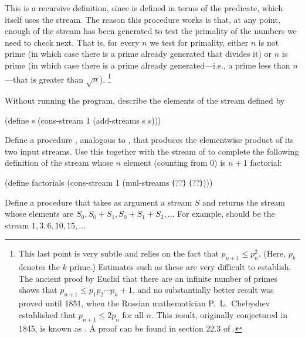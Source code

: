 This is a recursive definition, since  is defined in terms of the  predicate, which itself uses the  stream.
The reason this procedure works is that, at any point, enough of the  stream has been generated to test the primality of the numbers we need to check next.
That is, for every \( n \) we test for primality, either \( n \) is not prime (in which case there is a prime already generated that divides it) or \( n \) is prime (in which case there is a prime already generated---i.e., a prime less than \( n \)---that is greater than \( \sqrt{n} \)).%
\footnote{
	This last point is very subtle and relies on the fact that \( p_{n+1} ≤ p_n^2 \).
	(Here, \( p_k \) denotes the \( k \) prime.)
	Estimates such as these are very difficult to establish.
	The ancient proof by Euclid that there are an infinite number of primes shows that \( p_{n+1} ≤ p_1 p_2 \dotsm p_n + 1 \), and no substantially better result was proved until 1851, when the Russian mathematician P.~L.~Chebyshev established that \( p_{n+1} ≤ 2 p_n \) for all \( n \).
	This result, originally conjectured in 1845, is known as .
	A proof can be found in section 22.3 of .
}



\begin{exercise}
	\label{Exercise 3.53}
	Without running the program, describe the elements of the stream defined by
	\begin{scheme}
	  (define s (cons-stream 1 (add-streams s s)))
	\end{scheme}
\end{exercise}



\begin{exercise}
	\label{Exercise 3.54}
	Define a procedure , analogous to , that produces the elementwise product of its two input streams.
	Use this together with the stream of  to complete the following definition of the stream whose \( n \) element (counting from \( 0 \)) is \( n + 1 \) factorial:
	\begin{scheme}
	  (define factorials
	    (cons-stream 1 (mul-streams ⟨??⟩ ⟨??⟩)))
	\end{scheme}
\end{exercise}



\begin{exercise}
	\label{Exercise 3.55}
	Define a procedure  that takes as argument a stream \( S \) and returns the stream whose elements are \( S_0, S_0 + S_1, S_0 + S_1 + S_2, \dotsc \)
	For example,  should be the stream \( 1, 3, 6, 10, 15, \dotsc \)
\end{exercise}



